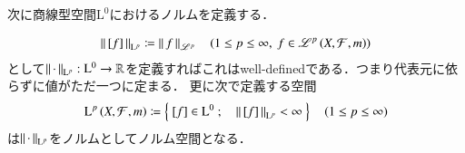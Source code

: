 次に商線型空間$\mathrm{L}^0$におけるノルムを定義する．
\begin{itembox}[l]{}
	\begin{lem}
		\begin{align}
			\left\|\, [f]\, \right\|_{\mathrm{L}^p} \coloneqq \left\|\, f\, \right\|_{\mathscr{L}^p} \quad (1 \leq p \leq \infty,\ f \in \mathscr{L}^{p} \left(X,\mathcal{F},m\right))
		\end{align}
		として$\left\|\, \cdot\, \right\|_{\mathrm{L}^p}:\mathrm{L}^0 \rightarrow \mathbb{R}$を定義すればこれはwell-definedである．つまり代表元に依らずに値がただ一つに定まる．
		更に次で定義する空間
		\begin{align}
			\operatorname{L}^{p} \left(X,\mathcal{F},m\right) \coloneqq \left\{\ [f] \in \mathrm{L}^0\ ;\quad \left\|\, [f]\, \right\|_{\mathrm{L}^p} < \infty\ \right\} \quad (1 \leq p \leq \infty)
		\end{align}
		は$\left\|\, \cdot\, \right\|_{\mathrm{L}^p}$をノルムとしてノルム空間となる．
	\end{lem}
\end{itembox}

